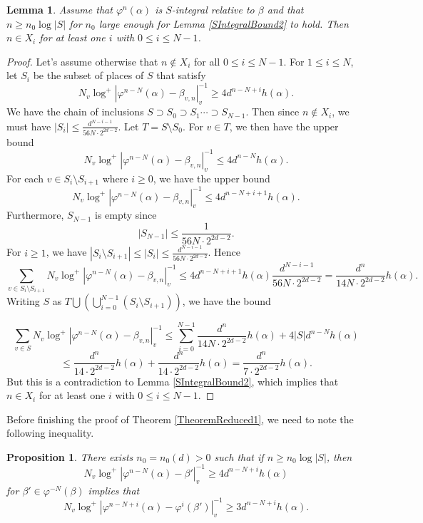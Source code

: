 \documentclass[10pt, reqno]{amsart}
\newcommand{\vphi}{\varphi}
\numberwithin{theorem}{section}
\newtheorem{lemma}[theorem]{Lemma}
\newtheorem{proposition}[theorem]{Proposition}
\numberwithin{equation}{section}
\numberwithin{example}{section}
\numberwithin{definition}{section}
\begin{document}
\begin{lemma} \label{SIntegralBound3}
Assume that $\vphi^n(\alpha)$ is $S$-integral relative to $\beta$ and that $n \geq n_0 \log |S| $ for $n_0$ large enough for Lemma \ref{SIntegralBound2} to hold. Then $n \in X_i$ for at least one $i$ with $0 \leq i \leq N-1$. 
\end{lemma}

\begin{proof}
Let's assume otherwise that $n \not \in X_i$ for all $0 \leq i \leq N-1$. For $1 \leq i \leq N$, let $S_i$ be the subset of places of $S$ that satisfy
$$N_v \log^+|\vphi^{n-N}(\alpha) - \beta_{v,n}|^{-1}_v \geq 4 d^{n-N+i} h(\alpha).$$
We have the chain of inclusions $S \supset S_0 \supset S_1 \cdots \supset S_{N-1}$. Then since $n \not \in X_i$, we must have $|S_i| \leq \frac{d^{N-i-1}}{56N \cdot 2^{2d-2}}$. Let $T = S \setminus S_0$. For $v \in T$, we then have the upper bound 
$$N_v \log^+|\vphi^{n-N}(\alpha) - \beta_{v,n}|_v^{-1} \leq 4d^{n-N} h(\alpha).$$
For each $v \in  S_{i} \setminus S_{i+1}$ where $i \geq 0$, we have the upper bound 
$$N_v \log^+|\vphi^{n-N}(\alpha) - \beta_{v,n}|_v^{-1} \leq 4d^{n-N+i+1} h(\alpha).$$
Furthermore, $S_{N-1}$ is empty since
$$|S_{N-1}| \leq \frac{1}{56N \cdot 2^{2d-2}}.$$
For $i \geq 1$, we have $|S_{i} \setminus S_{i+1}| \leq |S_i| \leq \frac{d^{N-i-1}}{56N \cdot 2^{2d-2}}$. Hence 
$$\sum_{v \in S_{i} \setminus S_{i+1}} N_v \log^+|\vphi^{n-N}(\alpha) - \beta_{v,n}|_v^{-1} \leq 4d^{n-N+i+1} h(\alpha) \frac{d^{N-i-1}}{56N \cdot 2^{2d-2}} = \frac{d^n}{14N \cdot2^{2d-2}} h(\alpha).$$
Writing $S$ as $T \bigcup \left(\bigcup_{i=0}^{N-1} (S_{i} \setminus S_{i+1}) \right)$, we have the bound 

$$\sum_{v \in S} N_v \log^+|\vphi^{n-N}(\alpha) - \beta_{v,n}|_v^{-1} \leq \sum_{i=0}^{N-1} \frac{d^n}{14N \cdot2^{2d-2}} h(\alpha) + 4|S| d^{n-N} h(\alpha)$$ 
$$\leq \frac{d^n}{14 \cdot2^{2d-2}}  h(\alpha) + \frac{d^n}{14 \cdot2^{2d-2}} h(\alpha) = \frac{d^n}{7 \cdot 2^{2d-2}} h(\alpha).$$
But this is a contradiction to Lemma \ref{SIntegralBound2}, which implies that $n \in X_i$ for at least one $i$ with $0 \leq i \leq N-1$.
\end{proof}

Before finishing the proof of Theorem \ref{TheoremReduced1}, we need to note the following inequality. 

\begin{proposition} \label{SIntegralBound4}
There exists $n_0 = n_0(d) > 0$ such that if $n \geq n_0 \log |S|$, then 
$$N_v \log^+|\vphi^{n-N}(\alpha) - \beta'|_v^{-1} \geq 4d^{n-N+i}h(\alpha)$$
for $\beta' \in \vphi^{-N}(\beta)$ implies that 
$$N_v \log^+|\vphi^{n-N+i}(\alpha) - \vphi^i(\beta')|_v^{-1} \geq 3 d^{n-N+i} h(\alpha).$$
\end{proposition}
\end{document}
